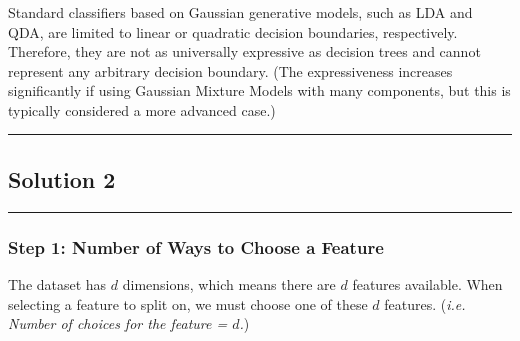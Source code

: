 \documentclass{article}
\begin{document}
\subsubsection*{}
\parbox{\textwidth}{
Standard classifiers based on Gaussian generative models, such as LDA and QDA, are limited to linear or quadratic decision boundaries, respectively. Therefore, they are not as universally expressive as decision trees and cannot represent any arbitrary decision boundary. (The expressiveness increases significantly if using Gaussian Mixture Models with many components, but this is typically considered a more advanced case.)
}

\noindent\rule{\textwidth}{0.4pt}

\newpage

\subsection*{Solution 2}
\noindent\rule{\textwidth}{0.4pt}

\subsubsection*{Step 1: Number of Ways to Choose a Feature}
\parbox{\textwidth}{
The dataset has $d$ dimensions, which means there are $d$ features available. When selecting a feature to split on, we must choose one of these $d$ features. (\textit{i.e. Number of choices for the feature = $d$.})
}
\end{document}
